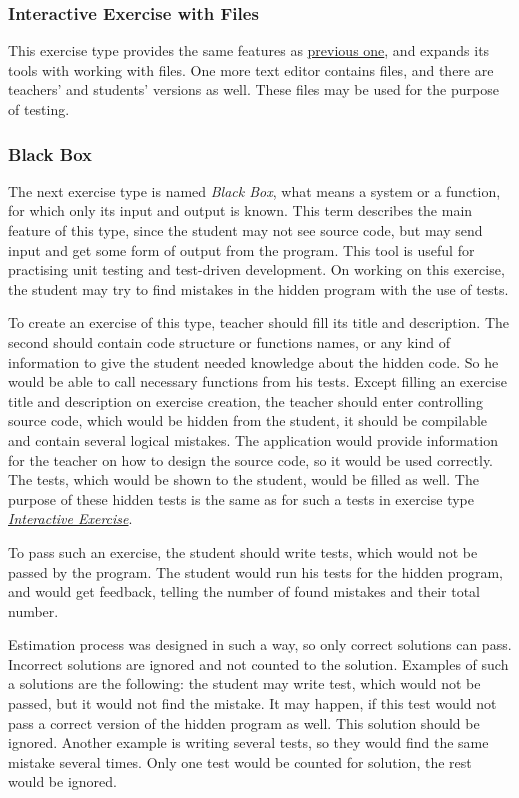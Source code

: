             \subsubsection{Interactive Exercise with Files}
            This exercise type provides the same features as \hyperref[subsubsec:whitebox]{previous one}, and expands its tools with working with files. One more text editor contains files, and there are teachers' and students' versions as well. These files may be used for the purpose of testing.
            
            \subsubsection{Black Box}
            \label{subsubsec:blackbox}
            The next exercise type is named \textit{Black Box}, what means a system or a function, for which only its input and output is known. This term describes the main feature of this type, since the student may not see source code, but may send input and get some form of output from the program. This tool is useful for practising unit testing and test-driven development. On working on this exercise, the student may try to find mistakes in the hidden program with the use of tests.
            
            To create an exercise of this type, teacher should fill its title and description. The second should contain code structure or functions names, or any kind of information to give the student needed knowledge about the hidden code. So he would be able to call necessary functions from his tests. Except filling an exercise title and description on exercise creation, the teacher should enter controlling source code, which would be hidden from the student, it should be compilable and contain several logical mistakes. The application would provide information for the teacher on how to design the source code, so it would be used correctly. The tests, which would be shown to the student, would be filled as well. The purpose of these hidden tests is the same as for such a tests in exercise type \hyperref[subsubsec:whitebox]{\textit{Interactive Exercise}}.
            
            To pass such an exercise, the student should write tests, which would not be passed by the program. The student would run his tests for the hidden program, and would get feedback, telling the number of found mistakes and their total number.
            
            Estimation process was designed in such a way, so only correct solutions can pass. Incorrect solutions are ignored and not counted to the solution. Examples of such a solutions are the following: the student may write test, which would not be passed, but it would not find the mistake. It may happen, if this test would not pass a correct version of the hidden program as well. This solution should be ignored. Another example is writing several tests, so they would find the same mistake several times. Only one test would be counted for solution, the rest would be ignored.
            
